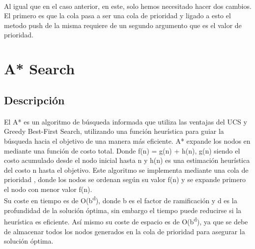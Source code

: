 \documentclass{report}
\begin{document}
          \paragraph*{}{
            Al igual que en el caso anterior, en este, solo hemos necesitado hacer dos cambios.
            El primero es que la cola pasa a ser una cola de prioridad y ligado a esto el metodo push de la misma requiere de un segundo argumento que es el valor de prioridad.
          }
      \clearpage\section{A* Search}
        \subsection*{Descripción}
          \paragraph*{}{
            El A* es un algoritmo de búsqueda informada que utiliza las ventajas del UCS y Greedy Best-First Search, utilizando una función heurística para guiar la búsqueda hacia el objetivo de una manera más eficiente. A* expande los nodos en mediante una función de costo total. Donde f(n) = g(n) + h(n), g(n) siendo el costo acumulado desde el nodo inicial hasta n y h(n) es una estimación heurística del costo n hasta el objetivo. Este algoritmo se implementa mediante una cola de prioridad , donde los nodos se ordenan según su valor f(n) y se expande primero el nodo con menor valor f(n).\\
            Su coste en tiempo es de O(b\textsuperscript{d}), donde b es el factor de ramificación y d es la profundidad de la solución óptima, sin embargo el tiempo puede reducirse si la heurística es eficiente. Así mismo su coste de espacio es de  O(b\textsuperscript{d}), ya que se debe de almacenar todos los nodos generados en la cola de prioridad para asegurar la solución óptima.
          }
\end{document}
